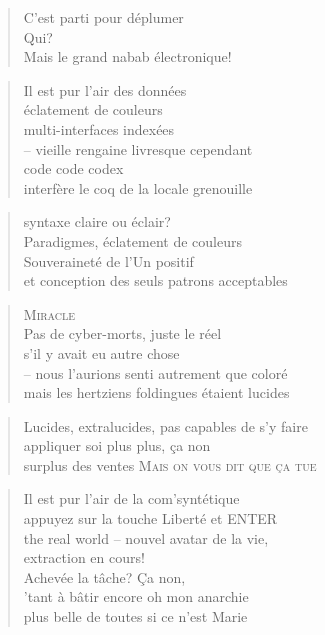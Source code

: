   \begin{verse}
    C’est parti pour déplumer\\
    Qui?\\
    Mais le grand nabab électronique!
  \end{verse}
  \begin{verse}
    Il est pur l’air des données\\
    éclatement de couleurs\\
    multi-interfaces indexées\\
    -- vieille rengaine livresque cependant\\
    code code codex\\
    interfère le coq de la locale grenouille
  \end{verse}
  \begin{verse}
    syntaxe claire ou éclair?\\
    Paradigmes, éclatement de couleurs\\
    Souveraineté de l’Un positif\\
    et conception des seuls patrons acceptables
  \end{verse}
  \begin{verse}
    \textsc{Miracle}\\
    Pas de cyber-morts, juste le réel\\
    s’il y avait eu autre chose\\
    -- nous l’aurions senti autrement que coloré\\
    mais les hertziens foldingues étaient lucides
  \end{verse}
  \begin{verse}
    Lucides, extralucides, pas capables de s’y faire\\
    appliquer soi plus plus, ça non\\
    surplus des ventes \textsc{Mais on vous dit que ça tue}
  \end{verse}
  \begin{verse}
    Il est pur l’air de la com’syntétique\\
    appuyez sur la touche Liberté et ENTER\\
    the real world -- nouvel avatar de la vie,\\
    extraction en cours!\\
    Achevée la tâche? Ça non,\\
    ’tant à bâtir encore oh mon anarchie\\
    plus belle de toutes si ce n’est Marie
  \end{verse}
